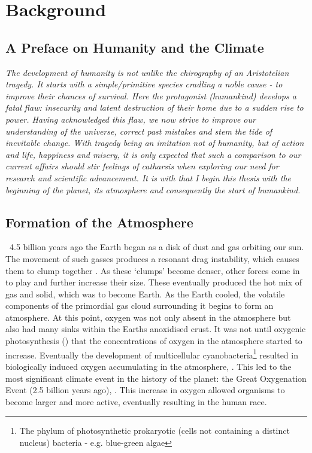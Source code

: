 \section{Background}
\subsection{A Preface on Humanity and the Climate}
\begin{flushleft}\emph{
The development of humanity is not unlike the chirography of an Aristotelian tragedy. It starts with a simple/primitive species cradling a noble cause - to improve their chances of survival. Here the protagonist (humankind) develops a fatal flaw: insecurity and latent destruction of their home due to a sudden rise to power.
Having acknowledged this flaw, we now strive to improve our understanding of the universe, correct past mistakes and stem the tide of inevitable change. \vspace{\baselineskip}\linebreak
With tragedy being an imitation not of humanity, but of action and life, happiness and misery, it is only expected that such a comparison to our current affairs should stir feelings of catharsis when exploring our need for research and scientific advancement.
It is with that I begin this thesis with the beginning of the planet, its atmosphere and consequently the start of humankind.
}
\end{flushleft}


\subsection{Formation of the Atmosphere}
 ~4.5 billion years ago the Earth began as a disk of dust and gas orbiting our sun. The movement of such gasses produces a resonant drag instability, which causes them to clump together \citep{drag,planet}. As these `clumps' become denser, other forces come in to play and further increase their size. These eventually produced the hot mix of gas and solid, which was to become Earth.
 As the Earth cooled, the volatile components of the primordial gas cloud surrounding it begins to form an atmosphere. %
At this point, oxygen was not only absent in the atmosphere but also had many sinks within the Earths anoxidised crust. It was not until oxygenic photosynthesis (\citep{oxygenicphotosynthesis}) that the concentrations of oxygen in the atmosphere started to increase. Eventually the development of multicellular cyanobacteria\footnote{The phylum of photosynthetic prokaryotic (cells not containing a distinct nucleus) bacteria - e.g. blue-green algae} resulted in biologically induced oxygen accumulating in the atmosphere, \citep{multicellular}. This led to the most significant climate event in the history of the planet: the Great Oxygenation Event (2.5 billion years ago), \citep{oxidation}. This increase in oxygen allowed organisms to become larger and more active, eventually resulting in the human race.


